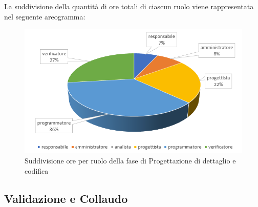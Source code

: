 La suddivisione della quantità di ore totali di ciascun ruolo viene rappresentata nel seguente areogramma:

\begin{figure}[h]
	\centering
	\caption{Suddivisione ore per ruolo della fase di Progettazione di dettaglio e codifica}
	\includegraphics[scale=2]{sezioni/Aerogrammi/AerogrammaDiDettaglio.png}
\end{figure}

\clearpage
\subsection{Validazione e Collaudo}

